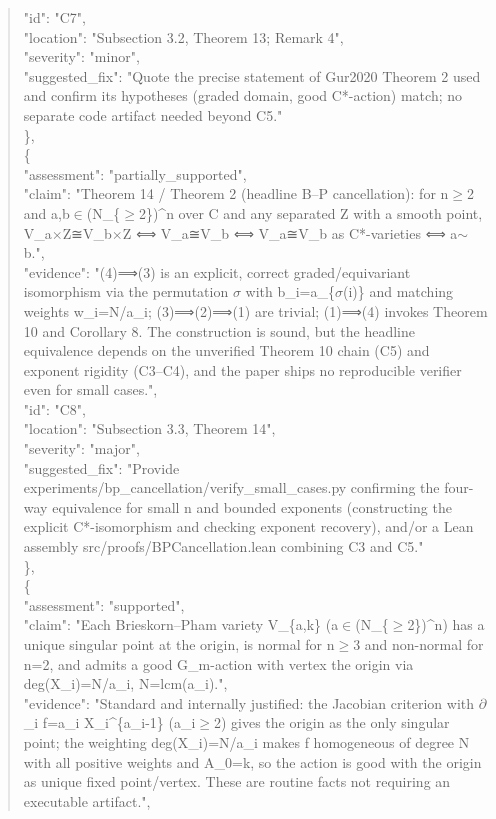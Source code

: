 \documentclass[11pt]{article}
\begin{document}
\begin{quote}
      "id": "C7",\\
      "location": "Subsection 3.2, Theorem 13; Remark 4",\\
      "severity": "minor",\\
      "suggested\_fix": "Quote the precise statement of Gur2020 Theorem 2 used and confirm its hypotheses (graded domain, good C*-action) match; no separate code artifact needed beyond C5."\\
    \},\\
    \{\\
      "assessment": "partially\_supported",\\
      "claim": "Theorem 14 / Theorem 2 (headline B--P cancellation): for n\ensuremath{\ge}2 and a,b\ensuremath{\in}(N\_\{\ensuremath{\ge}2\})\^{}n over C and any separated Z with a smooth point, V\_a\ensuremath{\times}Z≅V\_b\ensuremath{\times}Z ⟺ V\_a≅V\_b ⟺ V\_a≅V\_b as C*-varieties ⟺ a\ensuremath{\sim}b.",\\
      "evidence": "(4)⟹(3) is an explicit, correct graded/equivariant isomorphism via the permutation \ensuremath{\sigma} with b\_i=a\_\{\ensuremath{\sigma}(i)\} and matching weights w\_i=N/a\_i; (3)⟹(2)⟹(1) are trivial; (1)⟹(4) invokes Theorem 10 and Corollary 8. The construction is sound, but the headline equivalence depends on the unverified Theorem 10 chain (C5) and exponent rigidity (C3--C4), and the paper ships no reproducible verifier even for small cases.",\\
      "id": "C8",\\
      "location": "Subsection 3.3, Theorem 14",\\
      "severity": "major",\\
      "suggested\_fix": "Provide experiments/bp\_cancellation/verify\_small\_cases.py confirming the four-way equivalence for small n and bounded exponents (constructing the explicit C*-isomorphism and checking exponent recovery), and/or a Lean assembly src/proofs/BPCancellation.lean combining C3 and C5."\\
    \},\\
    \{\\
      "assessment": "supported",\\
      "claim": "Each Brieskorn--Pham variety V\_\{a,k\} (a\ensuremath{\in}(N\_\{\ensuremath{\ge}2\})\^{}n) has a unique singular point at the origin, is normal for n\ensuremath{\ge}3 and non-normal for n=2, and admits a good G\_m-action with vertex the origin via deg(X\_i)=N/a\_i, N=lcm(a\_i).",\\
      "evidence": "Standard and internally justified: the Jacobian criterion with \ensuremath{\partial}\_i f=a\_i X\_i\^{}\{a\_i-1\} (a\_i\ensuremath{\ge}2) gives the origin as the only singular point; the weighting deg(X\_i)=N/a\_i makes f homogeneous of degree N with all positive weights and A\_0=k, so the action is good with the origin as unique fixed point/vertex. These are routine facts not requiring an executable artifact.",\\

\end{quote}
\end{document}
